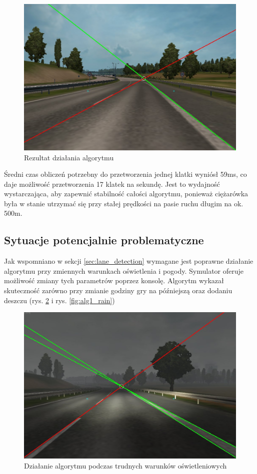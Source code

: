 \begin{figure}
  \centering
  \includegraphics[width=13cm]{img/alg1_res.jpg}
  \caption{Rezultat działania algorytmu}
  \label{fig:alg1_res}
\end{figure}

Średni czas obliczeń potrzebny do przetworzenia jednej klatki wyniósł 59ms, co daje możliwość przetworzenia 17 klatek na sekundę. 
Jest to wydajność wystarczająca, aby zapewnić stabilność całości algorytmu, ponieważ ciężarówka była w stanie utrzymać się przy stałej prędkości na pasie ruchu długim na ok. 500m.

\subsection{Sytuacje potencjalnie problematyczne}
Jak wspomniano w sekcji \ref{sec:lane_detection} wymagane jest poprawne działanie algorytmu przy zmiennych warunkach oświetlenia i pogody. %
Symulator oferuje możliwość zmiany tych parametrów poprzez konsolę. 
Algorytm wykazał skuteczność zarówno przy zmianie godziny gry na późniejszą oraz dodaniu deszczu (rys. \ref{fig:alg1_late} i rys. \ref{fig:alg1_rain})

\begin{figure}
  \centering
  \includegraphics[width=13cm]{img/alg1_late.jpg}
  \caption{Działanie algorytmu podczas trudnych warunków oświetleniowych}
  \label{fig:alg1_late}
\end{figure}

